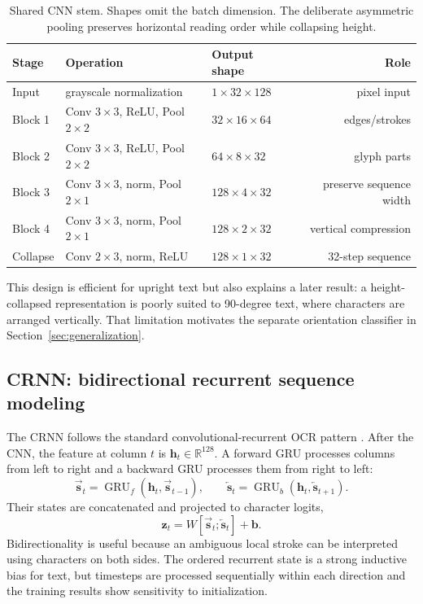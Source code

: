 \documentclass[10pt]{article}
\begin{document}
\begin{table}[H]
\centering
\small
\begin{tabular}{@{}lllr@{}}
\toprule
\textbf{Stage} & \textbf{Operation} & \textbf{Output shape} & \textbf{Role} \\
\midrule
Input & grayscale normalization & $1\times32\times128$ & pixel input \\
Block 1 & Conv $3\times3$, ReLU, Pool $2\times2$ &
    $32\times16\times64$ & edges/strokes \\
Block 2 & Conv $3\times3$, ReLU, Pool $2\times2$ &
    $64\times8\times32$ & glyph parts \\
Block 3 & Conv $3\times3$, norm, Pool $2\times1$ &
    $128\times4\times32$ & preserve sequence width \\
Block 4 & Conv $3\times3$, norm, Pool $2\times1$ &
    $128\times2\times32$ & vertical compression \\
Collapse & Conv $2\times3$, norm, ReLU &
    $128\times1\times32$ & 32-step sequence \\
\bottomrule
\end{tabular}
\caption{Shared CNN stem. Shapes omit the batch dimension. The deliberate asymmetric
pooling preserves horizontal reading order while collapsing height.}
\label{tab:cnn-stem}
\end{table}

This design is efficient for upright text but also explains a later result: a
height-collapsed representation is poorly suited to 90-degree text, where characters
are arranged vertically. That limitation motivates the separate orientation classifier
in Section~\ref{sec:generalization}.

\subsection{CRNN: bidirectional recurrent sequence modeling}

The CRNN follows the standard convolutional-recurrent OCR pattern
\cite{liu2022}. After the CNN, the feature at column $t$ is
$\mathbf{h}_t\in\mathbb{R}^{128}$. A forward GRU processes columns from left to right
and a backward GRU processes them from right to left:
\[
 \overrightarrow{\mathbf{s}}_t =
 \operatorname{GRU}_f(\mathbf{h}_t,\overrightarrow{\mathbf{s}}_{t-1}),\qquad
 \overleftarrow{\mathbf{s}}_t =
 \operatorname{GRU}_b(\mathbf{h}_t,\overleftarrow{\mathbf{s}}_{t+1}).
\]
Their states are concatenated and projected to character logits,
\[
 \mathbf{z}_t=W[\overrightarrow{\mathbf{s}}_t;
 \overleftarrow{\mathbf{s}}_t]+\mathbf{b}.
\]
Bidirectionality is useful because an ambiguous local stroke can be interpreted using
characters on both sides. The ordered recurrent state is a strong inductive bias for
text, but timesteps are processed sequentially within each direction and the training
results show sensitivity to initialization.
\end{document}
